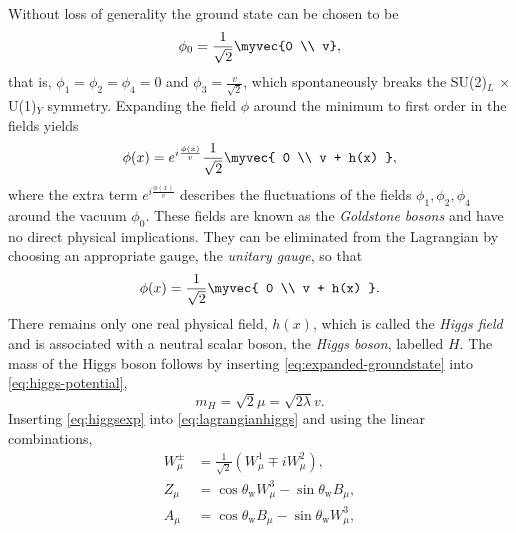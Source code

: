 Without loss of generality the ground state can be chosen to be
\begin{equation}
  \phi_0 = \frac{1}{\sqrt{2}} \myvec{0 \\ v},
  \label{eq:groundstate}
\end{equation}
that is, $\phi_1 = \phi_2 = \phi_4 = 0$ and $\phi_3 = \frac{v}{\sqrt{2}}$, which spontaneously breaks the SU(2)$_L$ $\times$ U(1)$_Y$ symmetry.
Expanding the field $\phi$ around the minimum to first order in the fields yields
\begin{equation}
  \phi(x) = e^{i\frac{\phi(x)}{v}}\frac{1}{\sqrt{2}} \myvec{ 0 \\ v + h(x) },
    \label{eq:higgsexp}
\end{equation}
where the extra term $e^{i\frac{\phi(x)}{v}}$ describes the fluctuations of the fields $\phi_1, \phi_2, \phi_4$ around the vacuum $\phi_0$.
These fields are known as the \emph{Goldstone bosons} and have no direct physical implications. They can be eliminated from the Lagrangian by choosing an appropriate gauge, the \emph{unitary gauge}, so that 
\begin{equation}
  \phi(x) = \frac{1}{\sqrt{2}} \myvec{ 0 \\ v + h(x) }.
  \label{eq:expanded-groundstate}
\end{equation}
There remains only one real physical field, $h(x)$, which is called the \emph{Higgs field} and is associated with a neutral scalar boson, the \emph{Higgs boson}, labelled $H$.
The mass of the Higgs boson follows by inserting \cref{eq:expanded-groundstate} into \cref{eq:higgs-potential},
\begin{equation}
  m_H = \sqrt{2} \mu = \sqrt{2 \lambda} v.
\end{equation}
Inserting \cref{eq:higgsexp} into \cref{eq:lagrangianhiggs} and using the linear combinations,
\begin{align}
  W_\mu^\pm &= \frac{1}{\sqrt{2}} \left( W_\mu^1 \mp iW_\mu^2 \right),  \\
  Z_\mu &= \cos\theta_\text{w} W_\mu^3 - \sin\theta_\text{w} B_\mu, \\
  A_\mu &= \cos\theta_\text{w} B_\mu - \sin\theta_\text{w} W_\mu^3,
\end{align}
